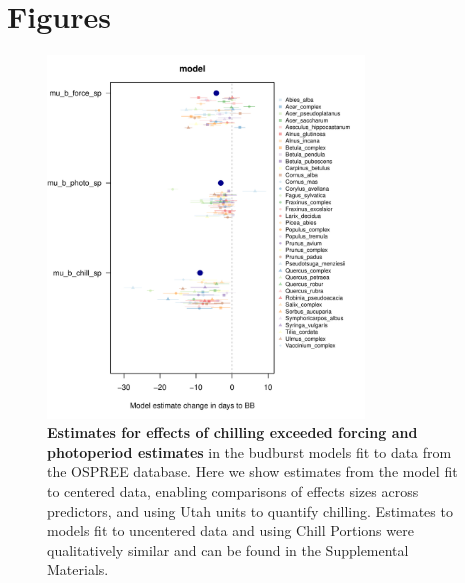 \documentclass{article}
\begin{document}




\section* {Figures}

\newpage

\begin{figure}[h!]
\centering
\noindent \includegraphics[width=0.75\textwidth]{..//..//analyses/bb_analysis/figures/muplotmodelspcompexprampfputah_z.pdf}
\caption{\textbf{Estimates for effects of chilling exceeded forcing and photoperiod estimates} in the budburst models fit to data from the OSPREE database. Here we show estimates from the model fit to centered data, enabling comparisons of effects sizes across predictors, and using Utah units to quantify chilling. Estimates to models fit to uncentered data and using Chill Portions were qualitatively similar and can be found in the Supplemental Materials.} 
\label{fig:mu}
\end{figure}
\end{document}
